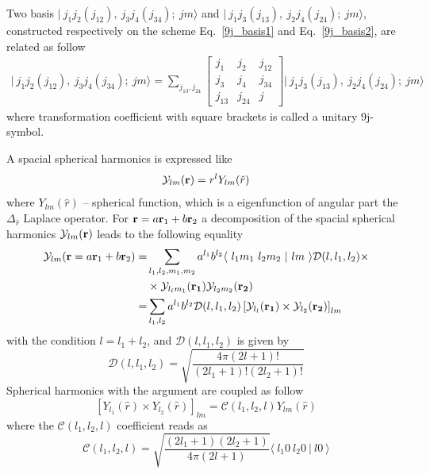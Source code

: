 \documentclass[12pt,a4paper,twoside]{article}
\begin{document}
Two basis  $\vert~ j_1 j_2 (j_{12}),~j_3 j_4 (j_{34});~jm \rangle$ and $\vert~ j_1 j_3 (j_{13}),~j_2 j_4 (j_{24});~jm \rangle $, constructed respectively on the scheme Eq.~\ref{9j_basis1} and Eq.~\ref{9j_basis2},  are related as follow
\begin{align}
\label{9j}
\vert~ j_1 j_2 (j_{12}),~j_3 j_4 (j_{34});~jm \rangle = \sum_{j_{13},j_{24}} 
\begin{bmatrix}
j_1 & j_2 & j_{12} \\ 
j_3 & j_4 & j_{34} \\ 
j_{13} & j_{24} & j
\end{bmatrix} 
\vert~ j_1 j_3 (j_{13}),~j_2 j_4 (j_{24});~jm \rangle 
\end{align}
where transformation coefficient with square brackets is called a unitary 9j-symbol.


  A spacial spherical harmonics is expressed like
  \begin{equation}
  \mathcal{Y}_{lm}({\bf r}) = r^{l} Y_{lm}(\hat{r})
  \end{equation}
  where $Y_{lm}(\hat{r})$  -- spherical function, which is a eigenfunction of angular part the $\Delta_{\hat{r}}$ Laplace operator.
  For ${\bf r} = a{\bf r}_1+b {\bf r}_2$ a decomposition of the spacial spherical harmonics $\mathcal{Y}_{lm}({\bf r})$ leads to the following equality
  \begin{align}
  \mathcal{Y}_{lm}({\bf r} = a{\bf r}_1+b {\bf r}_2)=& \sum_{l_1,l_2,m_1,m_2} a^{l_1} b^{l_2}
  \langle ~ l_1 m_1~l_2 m_2~ \vert ~l m~  \rangle \mathcal{D}(l,l_1,l_2) \times \nonumber \\
   & \times \mathcal{Y}_{l_l m_1}({\bf r_1})  \mathcal{Y}_{l_2 m_2}({\bf r_2}) \nonumber \\
   = & \sum_{l_1,l_2} a^{l_1} b^{l_2}
   \mathcal{D}(l,l_1,l_2) \left[ \mathcal{Y}_{l_l}({\bf r_1}) \times \mathcal{Y}_{l_2}({\bf r_2}) \right]_{lm} 
   \label{sphHarmDecomp}
  \end{align}
  with the condition $l=l_1+l_2$, and $\mathcal{D}(l,l_1,l_2) $ is given by
  \begin{equation}
  \mathcal{D}(l,l_1,l_2)  = \sqrt{\frac{4 \pi (2l+1)!}{(2l_1+1)! (2l_2+1)!}}
  \end{equation}
Spherical harmonics with the argument are coupled as follow
\begin{equation}
\left[ Y_{l_1}(\hat{r}) \times Y_{l_2}(\hat{r})\right]_{lm} =  \mathcal{C}(l_1,l_2,l) Y_{lm}(\hat{r})
\end{equation}
where the $\mathcal{C}(l_1,l_2,l)$ coefficient reads as
\begin{equation}
\mathcal{C}(l_1,l_2,l) = \sqrt{\frac{(2l_1+1)(2l_2+1)}{4 \pi (2l+1)}} \langle ~ l_1 0~l_2 0~ \vert ~l 0~  \rangle
\end{equation}
\end{document}
